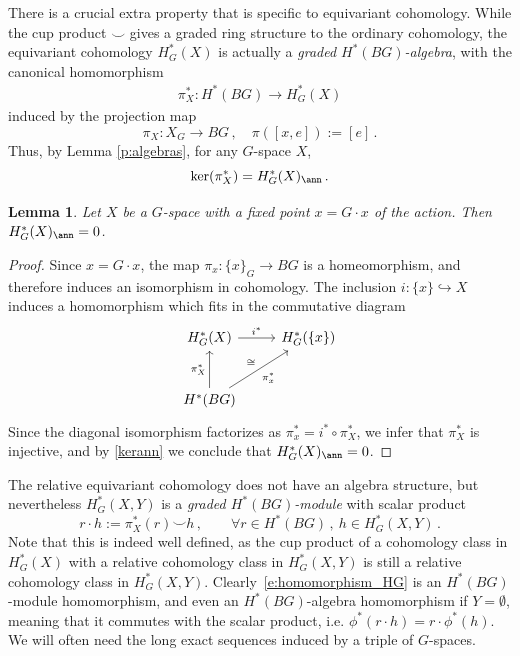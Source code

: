\documentclass[11pt,a4paper,reqno]{article}
\numberwithin{equation}{section}
\newtheorem{lemma}[theorem]{Lemma}
\theoremstyle{definition}
\begin{document}
\smallskip

There is a crucial extra property that is specific to equivariant cohomology. 
While the cup product $\smallsmile$ gives a graded ring structure to the ordinary cohomology, the equivariant cohomology $H^*_G(X)$ is actually a \emph{graded $H^*(BG)$-algebra}, with the canonical homomorphism
\begin{align}\label{procan}
\pi_X^*:H^*(BG)\to H^*_G(X)
\end{align}
induced by the projection map 
\begin{equation}\label{proiecan}
\pi_X:X_G\to BG \, , \quad \pi([x,e]) :=[e] \, . 
\end{equation} 
Thus, by Lemma \ref{p:algebras}, for any $G$-space $X$,  
\begin{equation}\label{kerann}
\ker(\pi_X^*) = H^*_G(X)_\ann 
\, . 
\end{equation}

\begin{lemma}\label{l:pi_X_injective}
Let $X$ be a  $G$-space with  a fixed point $x=G\cdot x$ of the  action. Then  $ 
H^*_G(X)_\ann  
= 0 $.  
\end{lemma}

\begin{proof}
Since $x=G\cdot x$, the map $\pi_x:\{x\}_G\to BG$ is a homeomorphism, and therefore induces an isomorphism in cohomology. The inclusion $i:\{x\}\hookrightarrow X$ induces a homomorphism which fits in the commutative diagram
\[
\begin{tikzcd}[row sep=large]
 H^*_G(X)
 \arrow[r,"i^*"]
 & 
 H^*_G(\{x\})
 \\
 H^*(BG)
 \arrow[u,"\pi_X^*"]
 \arrow[ur,"\pi_x^*"',"\cong"]
 & 
\end{tikzcd}
\]
Since the diagonal isomorphism factorizes as $\pi_x^*=i^*\circ\pi_X^*$, we infer that $\pi_X^*$ is injective, and by \eqref{kerann}
we conclude that $ 
H^*_G(X)_\ann  
= 0 $. 
\end{proof}



The relative equivariant cohomology does not have an algebra structure, but nevertheless $H^*_G(X,Y)$ is a \emph{graded $H^*(BG)$-module} with scalar product
\begin{equation}\label{cuppro}
r\cdot h:=\pi_X^*(r)\smallsmile h \, ,
\qquad\forall r\in H^*(BG) \, ,
\ h\in H^*_G(X,Y) \, .
\end{equation}
Note that this is indeed well defined, as the cup product of a cohomology class in $H^*_G(X)$ with a relative cohomology class in $H^*_G(X,Y)$ is still a relative cohomology class in $H^*_G(X,Y)$. Clearly~\eqref{e:homomorphism_HG} is an $H^*(BG)$-module homomorphism, and even an $H^*(BG)$-algebra homomorphism if $Y=\emptyset$, meaning that it commutes with the scalar product, i.e.
$ \phi^*(r\cdot h)=r\cdot\phi^*(h) $. 
We will  often need the long exact sequences induced by a triple of $G$-spaces.
\end{document}
